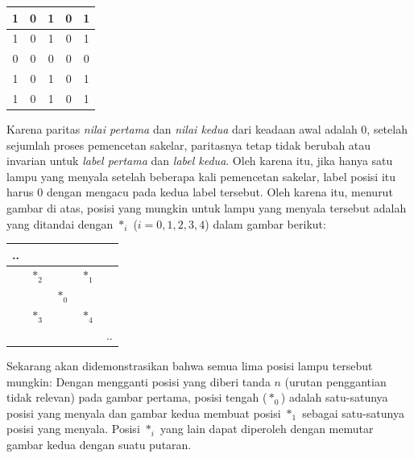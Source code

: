 \documentclass[11pt]{scrartcl}
\begin{document}
\begin{soaljawab}
\begin{solusi}
        \begin{center}
        \begin{tabular}{ |c|c|c|c|c| }
        \hline
        1 & 0 & 1 & 0 & 1 \\
        \hline
        1 & 0 & 1 & 0 & 1 \\
        \hline
        0 & 0 & 0 & 0 & 0 \\
        \hline
        1 & 0 & 1 & 0 & 1 \\
        \hline
        1 & 0 & 1 & 0 & 1 \\
        \hline
        \end{tabular}
        \end{center}
        Karena paritas \textit{nilai pertama} dan \textit{nilai kedua} dari keadaan awal adalah 0, setelah sejumlah proses pemencetan sakelar, paritasnya tetap tidak berubah atau invarian untuk \textit{label pertama} dan \textit{label kedua}. Oleh karena itu, jika hanya satu lampu yang menyala setelah beberapa kali pemencetan sakelar, label posisi itu harus 0 dengan mengacu pada kedua label tersebut. Oleh karena itu, menurut gambar di atas, posisi yang mungkin untuk lampu yang menyala tersebut adalah yang ditandai dengan $*_i$ ($i=0,1,2,3,4$) dalam gambar berikut:
        \begin{center}
        \begin{tabular}{ |c|c|c|c|c| }
        \hline
        ..&  &  &  &  \\
        \hline
        &  $*_2$ &  & $*_1$  &  \\
        \hline
        &  &  $*_0$ &  &  \\
        \hline
        & $*_3$ &  & $*_4 $&  \\
        \hline
        &  &  &  & .. \\
        \hline
        \end{tabular}
        \end{center}
        Sekarang akan didemonstrasikan bahwa semua lima posisi lampu tersebut mungkin:
        Dengan mengganti posisi yang diberi tanda $n$ (urutan penggantian tidak relevan) pada gambar pertama, posisi tengah ($*_0$) adalah satu-satunya posisi yang menyala dan gambar kedua membuat posisi $*_1$ sebagai satu-satunya posisi yang menyala. Posisi $*_i$ yang lain dapat diperoleh dengan memutar gambar kedua dengan suatu putaran.


\end{solusi}
\end{soaljawab}
\end{document}

